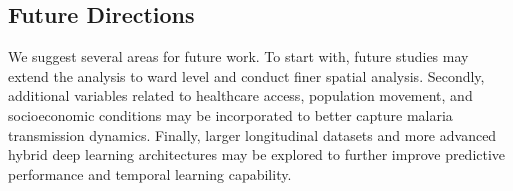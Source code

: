 \subsection{Future Directions}

We suggest several areas for future work. To start with, future studies may extend the analysis to ward level and conduct finer spatial analysis. Secondly, additional variables related to healthcare access, population movement, and socioeconomic conditions may be incorporated to better capture malaria transmission dynamics. Finally, larger longitudinal datasets and more advanced hybrid deep learning architectures may be explored to further improve predictive performance and temporal learning capability.





